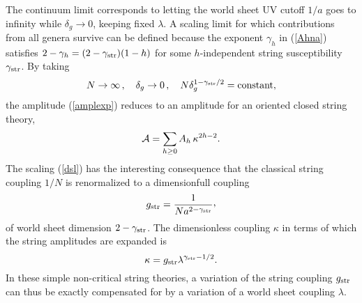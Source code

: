 \documentclass[a4paper,12pt]{article}
\def\cvp{\raise 2pt\hbox{,}}
\begin{document}
{\begin{equation}
\end{equation}
%
The continuum limit corresponds to letting the world sheet UV cutoff $1/a$ 
goes to infinity while $\delta_g \rightarrow 0$, keeping fixed $\lambda$.
A scaling limit for which 
contributions from all genera survive can be defined because the exponent 
$\gamma_{h}$ in (\ref{Ahna}) satisfies $2-\gamma_{h} = (2-\gamma_{\rm 
str})(1-h)$ for some $h$-independent string susceptibility $\gamma_{\rm str}$.
By taking
%
\begin{equation}
\label{dsl}
N\rightarrow\infty\, , \quad \delta_{g}\rightarrow 0\, ,\quad
N\delta_g^{1-\gamma_{\rm str}/2} = {\rm constant,}
\end{equation}
%
the amplitude (\ref{amplexp}) reduces to an amplitude for an oriented 
closed string theory,
%
\begin{equation}
\label{Aclosed}
{\cal A} = \sum_{h\geq 0} A_{h}\, \kappa^{2h-2}.
\end{equation}
%
The scaling (\ref{dsl}) has the interesting consequence that the classical 
string coupling $1/N$ is renormalized to a dimensionfull coupling
%
\begin{equation}
\label{csc}
g_{\rm str} = {1\over N a^{2-\gamma_{\rm str}}}\cvp
\end{equation}
%
of world sheet dimension $2-\gamma_{\rm str}$.
The dimensionless coupling $\kappa$ in terms of which the string 
amplitudes are expanded is 
%
\begin{equation}
\label{kappadef2}
\kappa = g_{\rm str}\lambda^{\gamma_{\rm str}-1/2}.
\end{equation}
%
In these simple non-critical string theories, a variation of 
the string coupling $g_{\rm str}$ can thus be exactly compensated for by a
variation of a world sheet coupling $\lambda$.

}
\end{document}
